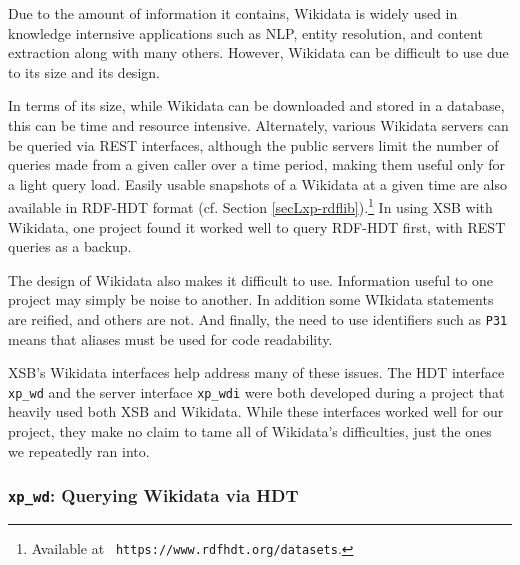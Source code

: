 Due to the amount of information it contains, Wikidata is widely used
in knowledge internsive applications such as NLP, entity resolution,
and content extraction along with many others.  However, Wikidata can
be difficult to use due to its size and its design.

In terms of its size, while Wikidata can be downloaded and stored in a
database, this can be time and resource intensive.  Alternately,
various Wikidata servers can be queried via REST interfaces, although
the public servers limit the number of queries made from a given
caller over a time period, making them useful only for a light query
load.  Easily usable snapshots of a Wikidata at a given time are also
available in RDF-HDT format (cf. Section
\ref{secLxp-rdflib}).\footnote{Available at {\tt
  https://www.rdfhdt.org/datasets}.}  In using XSB with Wikidata, one
project found it worked well to query RDF-HDT first, with REST queries
as a backup.

The design of Wikidata also makes it difficult to use.  Information
useful to one project may simply be noise to another.  In addition
some WIkidata statements are reified, and others are not.  And
finally, the need to use identifiers such as {\tt P31} means that
aliases must be used for code readability.

XSB's Wikidata interfaces help address many of these issues. The HDT
interface {\tt xp\_wd} and the server interface {\tt xp\_wdi} were
both developed during a project that heavily used both XSB and
Wikidata.  While these interfaces worked well for our project, they
make no claim to tame all of Wikidata's difficulties, just the ones we
repeatedly ran into.

\subsubsection{{\tt xp\_wd}: Querying Wikidata via HDT}


